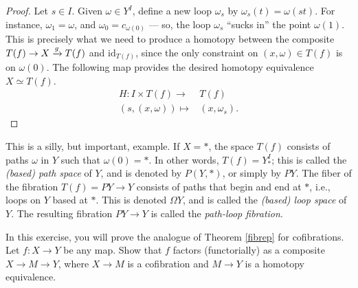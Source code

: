 \begin{proof}
	Let $s\in I$. Given $\omega \in Y^I$, define a new loop $\omega_s$ by $\omega_s(t) = \omega(st)$.
	For instance, $\omega_1 = \omega$, and $\omega_0 = c_{\omega(0)}$ --- so, the loop $\omega_s$ ``sucks in''
	the point $\omega(1)$.
	This is precisely what we need to produce a homotopy between the composite $T(f) \to X \xrightarrow{{g}} T(f)$ and
	$\mathrm{id}_{T(f)}$, since the only constraint on $(x,\omega)\in T(f)$ is on $\omega(0)$.
	The following map provides the desired homotopy equivalence $X \simeq T(f)$.
	\begin{align*}
	    H:I\times T(f)\to & T(f)\\
	    (s,(x,\omega))\mapsto & (x,\omega_s).
	\end{align*}
\end{proof}

\begin{example}
    This is a silly, but important, example.
    If $X = \ast$, the space $T(f)$ consists of paths $\omega$ in $Y$ such that $\omega(0) = \ast$.
    In other words, $T(f) = Y^I_\ast$; this is called the \emph{(based) path space} of $Y$, and is denoted by $P(Y,\ast)$,
    or simply by $PY$.
    The fiber of the fibration $T(f) = PY \to Y$ consists of paths that begin and end at $\ast$, i.e., 
    loops on $Y$ based at $\ast$.
    This is denoted $\Omega Y$, and is called the \emph{(based) loop space} of $Y$.
    The resulting fibration $PY \to Y$ is called the \emph{path-loop fibration}.
\end{example}

\begin{exercise}\label{cofibrep}
    In this exercise, you will prove the analogue of Theorem \ref{fibrep} for cofibrations.
    Let $f:X\to Y$ be any map.
    Show that $f$ factors (functorially) as a composite $X \to M \to Y$, where $X\to M$ is a cofibration and $M\to Y$ is a homotopy
    equivalence.
\end{exercise}

